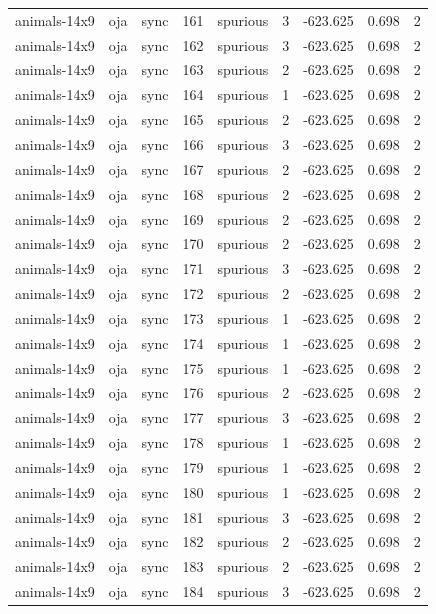 \begin{tabular}{lllrlrrrr}
animals-14x9 & oja & sync & 161 & spurious & 3 & -623.625 & 0.698 & 2 \\
animals-14x9 & oja & sync & 162 & spurious & 3 & -623.625 & 0.698 & 2 \\
animals-14x9 & oja & sync & 163 & spurious & 2 & -623.625 & 0.698 & 2 \\
animals-14x9 & oja & sync & 164 & spurious & 1 & -623.625 & 0.698 & 2 \\
animals-14x9 & oja & sync & 165 & spurious & 2 & -623.625 & 0.698 & 2 \\
animals-14x9 & oja & sync & 166 & spurious & 3 & -623.625 & 0.698 & 2 \\
animals-14x9 & oja & sync & 167 & spurious & 2 & -623.625 & 0.698 & 2 \\
animals-14x9 & oja & sync & 168 & spurious & 2 & -623.625 & 0.698 & 2 \\
animals-14x9 & oja & sync & 169 & spurious & 2 & -623.625 & 0.698 & 2 \\
animals-14x9 & oja & sync & 170 & spurious & 2 & -623.625 & 0.698 & 2 \\
animals-14x9 & oja & sync & 171 & spurious & 3 & -623.625 & 0.698 & 2 \\
animals-14x9 & oja & sync & 172 & spurious & 2 & -623.625 & 0.698 & 2 \\
animals-14x9 & oja & sync & 173 & spurious & 1 & -623.625 & 0.698 & 2 \\
animals-14x9 & oja & sync & 174 & spurious & 1 & -623.625 & 0.698 & 2 \\
animals-14x9 & oja & sync & 175 & spurious & 1 & -623.625 & 0.698 & 2 \\
animals-14x9 & oja & sync & 176 & spurious & 2 & -623.625 & 0.698 & 2 \\
animals-14x9 & oja & sync & 177 & spurious & 3 & -623.625 & 0.698 & 2 \\
animals-14x9 & oja & sync & 178 & spurious & 1 & -623.625 & 0.698 & 2 \\
animals-14x9 & oja & sync & 179 & spurious & 1 & -623.625 & 0.698 & 2 \\
animals-14x9 & oja & sync & 180 & spurious & 1 & -623.625 & 0.698 & 2 \\
animals-14x9 & oja & sync & 181 & spurious & 3 & -623.625 & 0.698 & 2 \\
animals-14x9 & oja & sync & 182 & spurious & 2 & -623.625 & 0.698 & 2 \\
animals-14x9 & oja & sync & 183 & spurious & 2 & -623.625 & 0.698 & 2 \\
animals-14x9 & oja & sync & 184 & spurious & 3 & -623.625 & 0.698 & 2 \\

\end{tabular}
